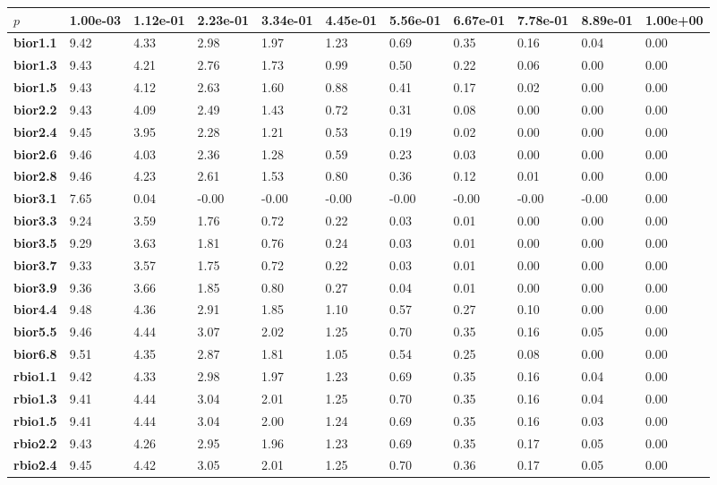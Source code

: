 \begin{tiny}\begin{longtable}{|l|l|l|l|l|l|l|l|l|l|l|}
\hline
$p$&\textbf{1.00e-03}&\textbf{1.12e-01}&\textbf{2.23e-01}&\textbf{3.34e-01}&\textbf{4.45e-01}&\textbf{5.56e-01}&\textbf{6.67e-01}&\textbf{7.78e-01}&\textbf{8.89e-01}&\textbf{1.00e+00}\\\hline
\textbf{bior1.1}&9.42&4.33&2.98&1.97&1.23&0.69&0.35&0.16&0.04&0.00\\\hline
\textbf{bior1.3}&9.43&4.21&2.76&1.73&0.99&0.50&0.22&0.06&0.00&0.00\\\hline
\textbf{bior1.5}&9.43&4.12&2.63&1.60&0.88&0.41&0.17&0.02&0.00&0.00\\\hline
\textbf{bior2.2}&9.43&4.09&2.49&1.43&0.72&0.31&0.08&0.00&0.00&0.00\\\hline
\textbf{bior2.4}&9.45&3.95&2.28&1.21&0.53&0.19&0.02&0.00&0.00&0.00\\\hline
\textbf{bior2.6}&9.46&4.03&2.36&1.28&0.59&0.23&0.03&0.00&0.00&0.00\\\hline
\textbf{bior2.8}&9.46&4.23&2.61&1.53&0.80&0.36&0.12&0.01&0.00&0.00\\\hline
\textbf{bior3.1}&7.65&0.04&-0.00&-0.00&-0.00&-0.00&-0.00&-0.00&-0.00&0.00\\\hline
\textbf{bior3.3}&9.24&3.59&1.76&0.72&0.22&0.03&0.01&0.00&0.00&0.00\\\hline
\textbf{bior3.5}&9.29&3.63&1.81&0.76&0.24&0.03&0.01&0.00&0.00&0.00\\\hline
\textbf{bior3.7}&9.33&3.57&1.75&0.72&0.22&0.03&0.01&0.00&0.00&0.00\\\hline
\textbf{bior3.9}&9.36&3.66&1.85&0.80&0.27&0.04&0.01&0.00&0.00&0.00\\\hline
\textbf{bior4.4}&9.48&4.36&2.91&1.85&1.10&0.57&0.27&0.10&0.00&0.00\\\hline
\textbf{bior5.5}&9.46&4.44&3.07&2.02&1.25&0.70&0.35&0.16&0.05&0.00\\\hline
\textbf{bior6.8}&9.51&4.35&2.87&1.81&1.05&0.54&0.25&0.08&0.00&0.00\\\hline
\textbf{rbio1.1}&9.42&4.33&2.98&1.97&1.23&0.69&0.35&0.16&0.04&0.00\\\hline
\textbf{rbio1.3}&9.41&4.44&3.04&2.01&1.25&0.70&0.35&0.16&0.04&0.00\\\hline
\textbf{rbio1.5}&9.41&4.44&3.04&2.00&1.24&0.69&0.35&0.16&0.03&0.00\\\hline
\textbf{rbio2.2}&9.43&4.26&2.95&1.96&1.23&0.69&0.35&0.17&0.05&0.00\\\hline
\textbf{rbio2.4}&9.45&4.42&3.05&2.01&1.25&0.70&0.36&0.17&0.05&0.00\\\hline

\end{longtable}
\end{tiny}
